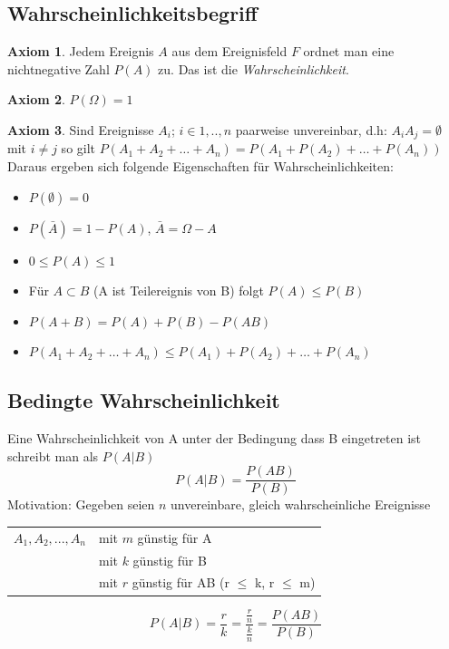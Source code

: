 \documentclass[10pt]{report}
\def\firstcircle{(0,0) circle (1.5cm)}
\def\secondcircle{(45:2cm) circle (1.5cm)}
\def\thirdcircle{(0:2cm) circle (1.5cm)}
\theoremstyle{definition}
\newtheorem{axiom}{Axiom}
\begin{document}

\subsection{Wahrscheinlichkeitsbegriff}
\begin{axiom}
	Jedem Ereignis $A$ aus dem Ereignisfeld $F$ ordnet man eine nichtnegative Zahl $P(A)$ zu. Das ist die \textit{Wahrscheinlichkeit}.
\end{axiom}
\begin{axiom}
	 $P(\Omega)=1$
\end{axiom}
\begin{axiom}
	Sind Ereignisse $A_i$; $i\in {1,..,n}$ paarweise unvereinbar, d.h: $A_i A_j = \emptyset$ mit $i \neq j $ so gilt $P(A_1+A_2+ \ldots + A_n) = P(A_1+P(A_2)+\ldots+P(A_n) )$ Daraus ergeben sich folgende Eigenschaften für Wahrscheinlichkeiten:
	\begin{itemize}
		\item $P(\emptyset)= 0$
		\item $P(\bar{A}) = 1 - P(A)$, $\bar{A} = \Omega -A$
		\item $ 0 \leq P(A) \leq 1$
		\item Für $A \subset B$ (A ist Teilereignis von B) folgt $P(A) \leq P(B)$
		\item $P(A+B) = P(A)+P(B)-P(AB)$
		\item  $P(A_1 + A_2+ \ldots +A_n) \leq P(A_1) + P(A_2)+ \ldots+P(A_n)$
	\end{itemize} 	
\end{axiom}

\subsection{Bedingte Wahrscheinlichkeit}
Eine Wahrscheinlichkeit von A unter der Bedingung dass B eingetreten ist schreibt man als $P(A|B)$
\[P(A|B) = \frac{P(AB)}{P(B)}\]
Motivation: Gegeben seien $n$ unvereinbare, gleich wahrscheinliche Ereignisse \\
\begin{tabular}{ll}
  $A_1,A_2,...,A_n$ & mit $m$ günstig für A \\
 & mit $k$ günstig für B \\ 
 & mit $r$ günstig für AB (r $\leq$ k, r $\leq$ m) \\ 
\end{tabular}
\[ P(A|B)=\frac{r}{k}=\frac{\frac{r}{n}}{\frac{k}{n}}=\frac{P(AB)}{P(B)} \]
\end{document}
